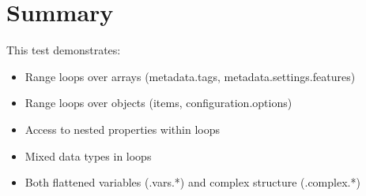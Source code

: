 \documentclass{article}
\begin{document}
\section{Summary}
This test demonstrates:
\begin{itemize}
\item Range loops over arrays (metadata.tags, metadata.settings.features)
\item Range loops over objects (items, configuration.options)
\item Access to nested properties within loops
\item Mixed data types in loops
\item Both flattened variables (.vars.*) and complex structure (.complex.*)
\end{itemize}
\end{document}
